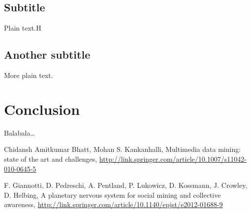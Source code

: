 \documentclass{icmmcm}
\begin{document}
\subsection{Subtitle}
Plain text.H

\subsection{Another subtitle}
More plain text.

\section{Conclusion}
Balabala\ldots


\begin{thebibliography}{2}
Chidansh Amitkumar Bhatt, Mohan S. Kankanhalli,
Multimedia data mining: state of the art and challenges,
\url{http://link.springer.com/article/10.1007/s11042-010-0645-5}

F. Giannotti, D. Pedreschi, A. Pentland, P.
Lukowicz, D. Kossmann, J.
Crowley, D. Helbing,
A planetary nervous system for social mining and collective awareness,
\url{http://link.springer.com/article/10.1140/epjst/e2012-01688-9}

\end{thebibliography}
\end{document}
